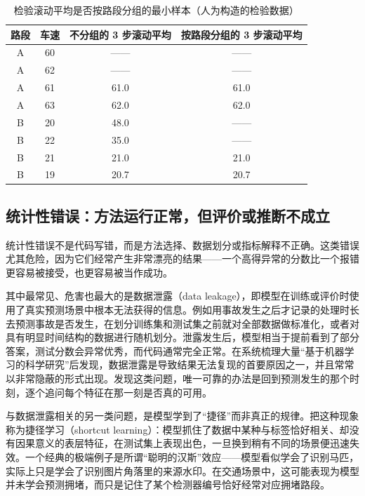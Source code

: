 \begin{table}[H]
\centering
\caption{检验滚动平均是否按路段分组的最小样本（人为构造的检验数据）}
\label{tab:ch12_minimal}
\small
\begin{tabular}{cccc}
\toprule
路段 & 车速 & 不分组的 3 步滚动平均 & 按路段分组的 3 步滚动平均 \\
\midrule
A & 60 & —— & —— \\
A & 62 & —— & —— \\
A & 61 & 61.0 & 61.0 \\
A & 63 & 62.0 & 62.0 \\
B & 20 & \cellcolor{red!15}48.0 & —— \\
B & 22 & \cellcolor{red!15}35.0 & —— \\
B & 21 & 21.0 & 21.0 \\
B & 19 & 20.7 & 20.7 \\
\bottomrule
\end{tabular}
\end{table}


\subsection{统计性错误：方法运行正常，但评价或推断不成立}

统计性错误不是代码写错，而是方法选择、数据划分或指标解释不正确。这类错误尤其危险，因为它们经常产生非常漂亮的结果——一个高得异常的分数比一个报错更容易被接受，也更容易被当作成功。

其中最常见、危害也最大的是数据泄露（data leakage），即模型在训练或评价时使用了真实预测场景中根本无法获得的信息。例如用事故发生之后才记录的处理时长去预测事故是否发生，在划分训练集和测试集之前就对全部数据做标准化，或者对具有明显时间结构的数据进行随机划分。泄露发生后，模型相当于提前看到了部分答案，测试分数会异常优秀，而代码通常完全正常\cite{kaufman2012leakage}。\citet{kapoor2023leakage}在系统梳理大量“基于机器学习的科学研究”后发现，数据泄露是导致结果无法复现的首要原因之一，并且常常以非常隐蔽的形式出现。发现这类问题，唯一可靠的办法是回到预测发生的那个时刻，逐个追问每个特征在那一刻是否真的可用。

与数据泄露相关的另一类问题，是模型学到了“捷径”而非真正的规律。\citet{geirhos2020shortcut}把这种现象称为捷径学习（shortcut learning）：模型抓住了数据中某种与标签恰好相关、却没有因果意义的表层特征，在测试集上表现出色，一旦换到稍有不同的场景便迅速失效。一个经典的极端例子是所谓“聪明的汉斯”效应——模型看似学会了识别马匹，实际上只是学会了识别图片角落里的来源水印\cite{lapuschkin2019clever}。在交通场景中，这可能表现为模型并未学会预测拥堵，而只是记住了某个检测器编号恰好经常对应拥堵路段。

